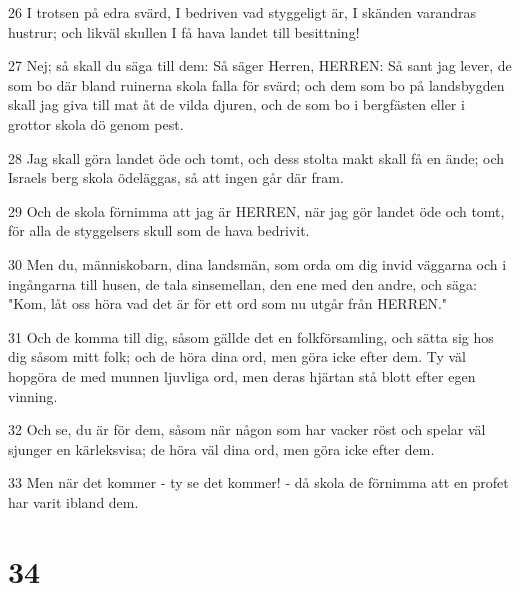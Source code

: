 \par 26 I trotsen på edra svärd, I bedriven vad styggeligt är, I skänden varandras hustrur; och likväl skullen I få hava landet till besittning!
\par 27 Nej; så skall du säga till dem: Så säger Herren, HERREN: Så sant jag lever, de som bo där bland ruinerna skola falla för svärd; och dem som bo på landsbygden skall jag giva till mat åt de vilda djuren, och de som bo i bergfästen eller i grottor skola dö genom pest.
\par 28 Jag skall göra landet öde och tomt, och dess stolta makt skall få en ände; och Israels berg skola ödeläggas, så att ingen går där fram.
\par 29 Och de skola förnimma att jag är HERREN, när jag gör landet öde och tomt, för alla de styggelsers skull som de hava bedrivit.
\par 30 Men du, människobarn, dina landsmän, som orda om dig invid väggarna och i ingångarna till husen, de tala sinsemellan, den ene med den andre, och säga: "Kom, låt oss höra vad det är för ett ord som nu utgår från HERREN."
\par 31 Och de komma till dig, såsom gällde det en folkförsamling, och sätta sig hos dig såsom mitt folk; och de höra dina ord, men göra icke efter dem. Ty väl hopgöra de med munnen ljuvliga ord, men deras hjärtan stå blott efter egen vinning.
\par 32 Och se, du är för dem, såsom när någon som har vacker röst och spelar väl sjunger en kärleksvisa; de höra väl dina ord, men göra icke efter dem.
\par 33 Men när det kommer - ty se det kommer! - då skola de förnimma att en profet har varit ibland dem.

\chapter{34}

